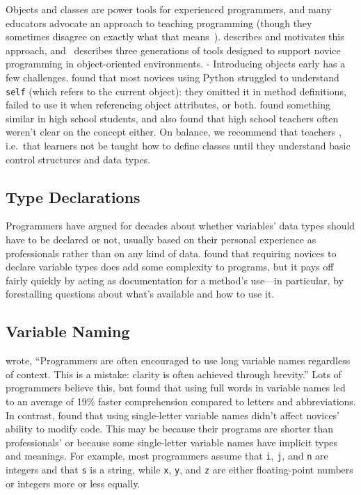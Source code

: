 Objects and classes are power tools for experienced programmers,
and many educators advocate an  approach to teaching programming
(though they sometimes disagree on exactly what that means~\cite{Benn2007b}).
\cite{Sorv2014} describes and motivates this approach,
and~\cite{Koll2015} describes three generations of tools
designed to support novice programming in object-oriented environments.
-
Introducing objects early has a few challenges.
\cite{Mill2016b} found that most novices using Python
struggled to understand \texttt{self}
(which refers to the current object):
they omitted it in method definitions,
failed to use it when referencing object attributes,
or both.
\cite{Rago2017} found something similar in high school students,
and also found that high school teachers often weren't clear on the concept either.
On balance,
we recommend that teachers ,
i.e.\ that learners not be taught how to define classes
until they understand basic control structures and data types.

\subsection*{Type Declarations}

Programmers have argued for decades about whether variables' data types should have to be declared or not,
usually based on their personal experience as professionals
rather than on any kind of data.
\cite{Endr2014,Fisc2015} found that requiring novices to declare variable types does add some complexity to programs,
but it pays off fairly quickly by acting as documentation for a method's use---in particular,
by forestalling questions about what's available and how to use it.

\subsection*{Variable Naming}

\cite{Kern1999} wrote,
``Programmers are often encouraged to use long variable names regardless of context.
This is a mistake: clarity is often achieved through brevity.''
Lots of programmers believe this,
but \cite{Hofm2017} found that using full words in variable names
led to an average of 19\% faster comprehension compared to letters and abbreviations.
In contrast,
\cite{Beni2017} found that using single-letter variable names didn't affect novices' ability to modify code.
This may be because their programs are shorter than professionals'
or because some single-letter variable names have implicit types and meanings.
For example,
most programmers assume that \texttt{i}, \texttt{j}, and \texttt{n} are integers
and that \texttt{s} is a string,
while \texttt{x}, \texttt{y}, and \texttt{z} are either floating-point numbers or integers
more or less equally.


